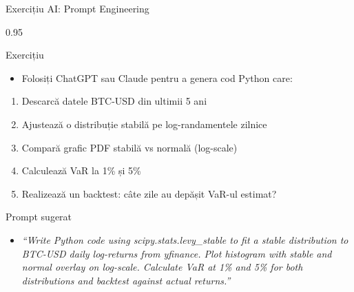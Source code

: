 \documentclass[9pt, aspectratio=169, t]{beamer}
\begin{document}
\begin{frame}{Exercițiu AI: Prompt Engineering}
    \begin{cminipage}{0.95\textwidth}
\begin{block}{Exercițiu}
\begin{itemize}\setlength{\itemsep}{0pt}
    \item Folosiți ChatGPT sau Claude pentru a genera cod Python care:
\end{itemize}
\end{block}

\begin{enumerate}\setlength{\itemsep}{0pt}
    \item Descarcă datele BTC-USD din ultimii 5 ani
    \item Ajustează o distribuție stabilă pe log-randamentele zilnice
    \item Compară grafic PDF stabilă vs normală (log-scale)
    \item Calculează VaR la 1\% și 5\%
    \item Realizează un backtest: câte zile au depășit VaR-ul estimat?
\end{enumerate}

\vspace{0.3cm}
\begin{alertblock}{Prompt sugerat}
\begin{itemize}\setlength{\itemsep}{0pt}
    \item \textit{``Write Python code using scipy.stats.levy\_stable to fit a stable distribution to BTC-USD daily log-returns from yfinance. Plot histogram with stable and normal overlay on log-scale. Calculate VaR at 1\% and 5\% for both distributions and backtest against actual returns.''}
\end{itemize}
\end{alertblock}
    \end{cminipage}
\end{frame}
\end{document}
